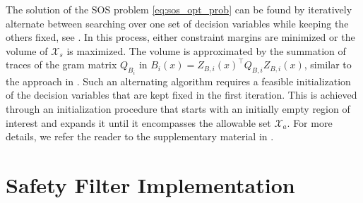 \documentclass[lettersize,journal]{IEEEtran}
\begin{document}
The solution of the SOS problem \cref{eq:sos_opt_prob} can be found by iteratively alternate between searching over one set of decision variables while keeping the others fixed, see \cite{TanPackard:04,schneeberger2023sos}.
In this process, either constraint margins are minimized or the volume of $\mathcal X_s$ is maximized.
The volume is approximated by the summation of traces of the gram matrix $Q_{B_i}$ in $B_i(x) = Z_{B,i}(x)^\top Q_{B,i} Z_{B,i}(x)$, similar to the approach in \cite{WangHan:18,KunduGeng:19}.
Such an alternating algorithm requires a feasible initialization of the decision variables that are kept fixed in the first iteration.
This is achieved through an initialization procedure that starts with an initially empty region of interest and expands it until it encompasses the allowable set $\mathcal X_a$.
For more details, we refer the reader to 
the supplementary material in \cite{schneeberger2024advanced}.






\section{Safety Filter Implementation} \label{sec:online_controller}
\end{document}
